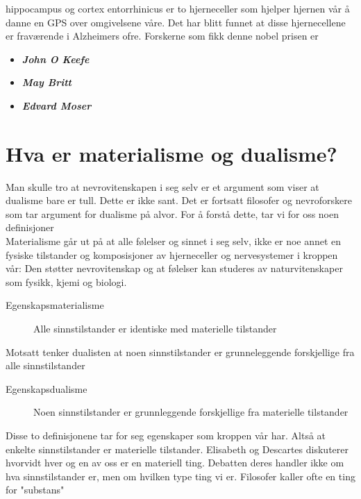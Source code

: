 \documentclass[11pt, a4paper]{article}
\begin{document}
hippocampus og cortex entorrhinicus er to hjerneceller som hjelper hjernen vår å danne en GPS over omgivelsene våre. Det har blitt funnet at disse hjernecellene er fraværende i Alzheimers ofre. Forskerne som fikk denne nobel prisen er

\begin{itemize}
    \item \textbf{\textit{John O Keefe }}
    \item \textbf{\textit{May Britt}}
    \item \textbf{\textit{Edvard Moser}}
\end{itemize}




\section{Hva er materialisme og dualisme?}

Man skulle tro at nevrovitenskapen i seg selv er et argument som viser at dualisme bare er tull. Dette er ikke sant. Det er fortsatt filosofer og nevroforskere som tar argument for dualisme på alvor. For å forstå dette, tar vi for oss noen definisjoner\\


Materialisme går ut på at alle følelser og sinnet i seg selv, ikke er noe annet en fysiske tilstander og komposisjoner av hjerneceller og nervesystemer i kroppen vår: Den støtter nevrovitenskap og at følelser kan studeres av naturvitenskaper som fysikk, kjemi og biologi.\\

\begin{description}
    \item[Egenskapsmaterialisme] Alle sinnstilstander er identiske med materielle tilstander 
\end{description}

Motsatt tenker dualisten at noen sinnstilstander er grunneleggende forskjellige fra alle sinnstilstander

\begin{description}
    \item[Egenskapsdualisme] Noen sinnstilstander er grunnleggende forskjellige fra materielle tilstander 
\end{description}


Disse to definisjonene tar for seg egenskaper som kroppen vår har. Altså at enkelte sinnstilstander er materielle tilstander. Elisabeth og Descartes diskuterer hvorvidt hver og en av oss er en materiell ting. Debatten deres handler ikke om hva sinnstilstander er, men om hvilken type ting vi er. Filosofer kaller ofte en ting for "substans"
\end{document}
